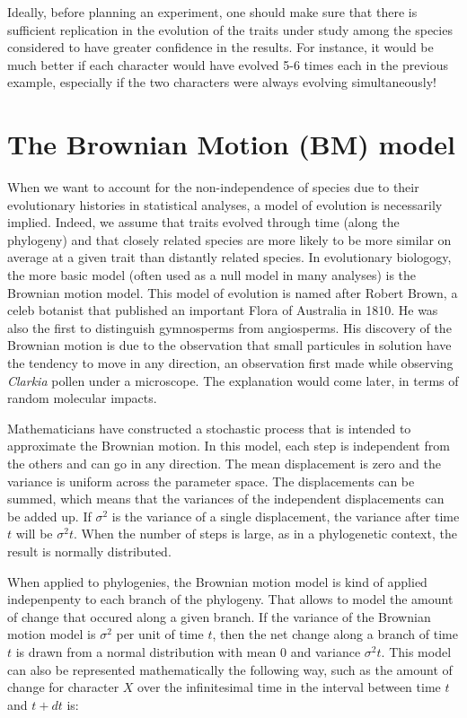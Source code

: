 \documentclass[
]{book}
\begin{document}
Ideally, before planning an experiment, one should make sure that there is sufficient replication in the evolution of the traits under study among the species considered to have greater confidence in the results. For instance, it would be much better if each character would have evolved 5-6 times each in the previous example, especially if the two characters were always evolving simultaneously!

\chapter{The Brownian Motion (BM) model}\label{BM-model}

When we want to account for the non-independence of species due to their evolutionary histories in statistical analyses, a model of evolution is necessarily implied. Indeed, we assume that traits evolved through time (along the phylogeny) and that closely related species are more likely to be more similar on average at a given trait than distantly related species. In evolutionary biologogy, the more basic model (often used as a null model in many analyses) is the Brownian motion model. This model of evolution is named after Robert Brown, a celeb botanist that published an important Flora of Australia in 1810. He was also the first to distinguish gymnosperms from angiosperms. His discovery of the Brownian motion is due to the observation that small particules in solution have the tendency to move in any direction, an observation first made while observing \emph{Clarkia} pollen under a microscope. The explanation would come later, in terms of random molecular impacts.

Mathematicians have constructed a stochastic process that is intended to approximate the Brownian motion. In this model, each step is independent from the others and can go in any direction. The mean displacement is zero and the variance is uniform across the parameter space. The displacements can be summed, which means that the variances of the independent displacements can be added up. If \(\sigma^2\) is the variance of a single displacement, the variance after time \(t\) will be \(\sigma^2t\). When the number of steps is large, as in a phylogenetic context, the result is normally distributed.

When applied to phylogenies, the Brownian motion model is kind of applied indepenpenty to each branch of the phylogeny. That allows to model the amount of change that occured along a given branch. If the variance of the Brownian motion model is \(\sigma^2\) per unit of time \(t\), then the net change along a branch of time \(t\) is drawn from a normal distribution with mean \(0\) and variance \(\sigma^2t\). This model can also be represented mathematically the following way, such as the amount of change for character \(X\) over the infinitesimal time in the interval between time \(t\) and \(t+dt\) is:
\end{document}
